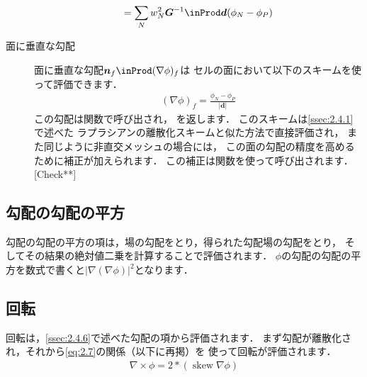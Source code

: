 \begin{description}
\begin{align}
             = \sum_{N}w_{N}^{2}\bm{G}^{-1} \inProd \bm{d}(\phi_{N} - \phi_{P})
            \end{align}
 \item[面に垂直な勾配] 面に垂直な勾配$\bm{n}_{f} \inProd (\nabla\phi)_{f}$は
            セルの面において以下のスキームを使って評価できます．
            \begin{align}
             \label{eq:2.28}
             (\nabla\phi)_{f} = \frac{\phi_{N} - \phi_{P}}{|\bm{d}|}
            \end{align}
            この勾配は関数で呼び出され，
            を返します．
            このスキームは\autoref{ssec:2.4.1}で述べた
            ラプラシアンの離散化スキームと似た方法で直接評価され，
            また同じように非直交メッシュの場合には，
            この面の勾配の精度を高めるために補正が加えられます．
            この補正は関数を使って呼び出されます．
            [Check**]
\end{description}


\subsection{勾配の勾配の平方}
\label{ssec:2.4.7}
勾配の勾配の平方の項は，場の勾配をとり，得られた勾配場の勾配をとり，
そしてその結果の絶対値二乗を計算することで評価されます．
$\phi$の勾配の勾配の平方を数式で書くと$|\nabla (\nabla\phi)|^{2}$となります．


\subsection{回転}
\label{ssec:2.4.8}
回転は，\autoref{ssec:2.4.6}で述べた勾配の項から評価されます．
まず勾配が離散化され，それから\autoref{eq:2.7}の関係（以下に再掲）を
使って回転が評価されます．
\begin{align*}
 \nabla \times \phi = 2 \mathop{*} (\mathop{\mathrm{skew}}\nabla\phi)
\end{align*}


